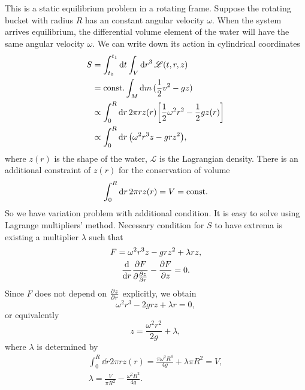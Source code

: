 \documentclass[10pt]{article}
\begin{document}
	This is a static equilibrium problem in a rotating frame. Suppose the rotating bucket with radius $R$ has an constant angular velocity $\omega$. When the system arrives equilibrium, the differential volume element of the water will have the same angular velocity $\omega$. We can write down its action in cylindrical coordinates
	\begin{align*}
		S &= \int_{t_0}^{t_1} \dd{t} \int_{V} \dd{r}^3 \mathscr{L}(t, r, z) \\
		&= {\mathrm{const.}} \int_M \dd{m} (\frac{1}{2} v^2 - g z) \\
		&\propto \int_{0}^{R} \dd{r} 2 \pi r z(r) \qty[\frac{1}{2} \omega^2 r^2 - \frac{1}{2} g z(r)] \\
		&\propto \int_{0}^{R} \dd{r} \qty(\omega^2 r^3 z - g r z^2),
	\end{align*}
	where $z(r)$ is the shape of the water, $\mathscr{L}$ is the Lagrangian density. There is an additional constraint of $z(r)$ for the conservation of volume
	\begin{equation}
		\int_0^R \dd{r} 2 \pi r z(r) = V = {\mathrm{const.}}
	\end{equation}
	So we have variation problem with additional condition. It is easy to solve using Lagrange multipliers' method. Necessary condition for $S$ to have extrema is existing a multiplier $\lambda$ such that
	\begin{gather}
		F = \omega^2 r^3 z - g r z^2 + \lambda r z, \\
		\dv{r} \pdv{F}{\pdv{z}{r}} - \pdv{F}{z} = 0.
	\end{gather}
	Since $F$ does not depend on $\pdv{z}{r}$ explicitly, we obtain
	\begin{equation}
		\omega^2 r^3 - 2 g r z + \lambda r = 0,
	\end{equation}
	or equivalently
	\begin{equation}
		z = \frac{\omega^2 r^2}{2g} + \lambda,
	\end{equation}
	where $\lambda$ is determined by
	\begin{gather*}
		\int_0^R \dd{r} 2 \pi r z(r) = \frac{\pi \omega^2 R^4}{4g} + \lambda \pi R^2 = V, \\
		\lambda = \frac{V}{\pi R^2} - \frac{\omega^2 R^2}{4 g}.
	\end{gather*}
\end{document}
